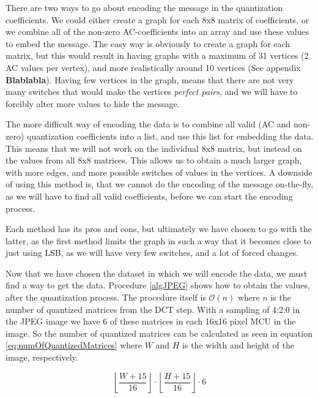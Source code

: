 There are two ways to go about encoding the message in the quantization coefficients. We could either create a graph for each 8x8 matrix of coefficients, or we combine all of the non-zero AC-coefficients into an array and use these values to embed the message. The easy way is obviously to create a graph for each matrix, but this would result in having graphs with a maximum of 31 vertices (2 AC values per vertex), and more realistically around 10 vertices (See appendix \textbf{Blablabla}). Having few vertices in the graph, means that there are not very many switches that would make the vertices \textit{perfect pairs}, and we will have to forcibly alter more values to hide the message.

The more difficult way of encoding the data is to combine all valid (AC and non-zero) quantization coefficients into a list, and use this list for embedding the data. This means that we will not work on the individual 8x8 matrix, but instead on the values from all 8x8 matrices. This allows us to obtain a much larger graph, with more edges, and more possible switches of values in the vertices. A downside of using this method is, that we cannot do the encoding of the message on-the-fly, as we will have to find all valid coefficients, before we can start the encoding process.

Each method has its pros and cons, but ultimately we have chosen to go with the latter, as the first method limits the graph in such a way that it becomes close to just using LSB, as we will have very few switches, and a lot of forced changes.

Now that we have chosen the dataset in which we will encode the data, we must find a way to get the data. Procedure \ref{algJPEG} shows how to obtain the values, after the quantization process. The procedure itself is $\mathcal{O}(n)$ where $n$ is the number of quantized matrices from the DCT step. With a sampling of 4:2:0 in the JPEG image we have 6 of these matrices in each 16x16 pixel MCU in the image. So the number of quantized matrices can be calculated as seen in equation \ref{eq:numOfQuantizedMatrices} where $W$ and $H$ is the width and height of the image, respectively.

\begin{equation}
\label{eq:numOfQuantizedMatrices}
\left \lfloor \frac{W + 15}{16}\right \rfloor \cdot \left \lfloor \frac{H + 15}{16}\right \rfloor \cdot 6
\end{equation}

